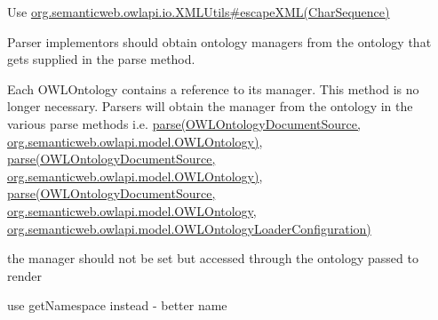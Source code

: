 \begin{DoxyRefList}
\item[\label{deprecated__deprecated000046}%
\hypertarget{deprecated__deprecated000046}{}%
Member \hyperlink{classorg_1_1coode_1_1string_1_1_escape_utils_acffc566dcc652f0075740fc0000e21e6}{org.coode.string.Escape\-Utils.escape\-X\-M\-L} (String s)]Use \hyperlink{classorg_1_1semanticweb_1_1owlapi_1_1io_1_1_x_m_l_utils_a1a205c2f88c8b381b5881f724c330ff2}{org.\-semanticweb.\-owlapi.\-io.\-X\-M\-L\-Utils\#escape\-X\-M\-L(\-Char\-Sequence)}  
\item[\label{deprecated__deprecated000001}%
\hypertarget{deprecated__deprecated000001}{}%
Member \hyperlink{classorg_1_1semanticweb_1_1owlapi_1_1io_1_1_abstract_o_w_l_parser_a0a4fbe6edb85000773d271f0337b7a77}{org.semanticweb.owlapi.io.Abstract\-O\-W\-L\-Parser.get\-O\-W\-L\-Ontology\-Manager} ()]Parser implementors should obtain ontology managers from the ontology that gets supplied in the parse method.  
\item[\label{deprecated__deprecated000002}%
\hypertarget{deprecated__deprecated000002}{}%
Member \hyperlink{interfaceorg_1_1semanticweb_1_1owlapi_1_1io_1_1_o_w_l_parser_a916ddd03b8d8f1b4708f116a66e29469}{org.semanticweb.owlapi.io.O\-W\-L\-Parser.set\-O\-W\-L\-Ontology\-Manager} (O\-W\-L\-Ontology\-Manager owl\-Ontology\-Manager)]Each {\ttfamily O\-W\-L\-Ontology} contains a reference to its manager. This method is no longer necessary. Parsers will obtain the manager from the ontology in the various parse methods i.\-e. \hyperlink{}{parse(\-O\-W\-L\-Ontology\-Document\-Source, org.\-semanticweb.\-owlapi.\-model.\-O\-W\-L\-Ontology)}, \hyperlink{}{parse(\-O\-W\-L\-Ontology\-Document\-Source, org.\-semanticweb.\-owlapi.\-model.\-O\-W\-L\-Ontology)}, \hyperlink{}{parse(\-O\-W\-L\-Ontology\-Document\-Source, org.\-semanticweb.\-owlapi.\-model.\-O\-W\-L\-Ontology, org.\-semanticweb.\-owlapi.\-model.\-O\-W\-L\-Ontology\-Loader\-Configuration)}  
\item[\label{deprecated__deprecated000003}%
\hypertarget{deprecated__deprecated000003}{}%
Member \hyperlink{interfaceorg_1_1semanticweb_1_1owlapi_1_1io_1_1_o_w_l_renderer_ab5374ee2c05ca35bbe5bba335fd5912f}{org.semanticweb.owlapi.io.O\-W\-L\-Renderer.set\-O\-W\-L\-Ontology\-Manager} (O\-W\-L\-Ontology\-Manager owl\-Ontology\-Manager)]the manager should not be set but accessed through the ontology passed to render  
\item[\label{deprecated__deprecated000004}%
\hypertarget{deprecated__deprecated000004}{}%
Member \hyperlink{classorg_1_1semanticweb_1_1owlapi_1_1model_1_1_i_r_i_a163c15f9487f650dc1c4a4940f55a4ca}{org.semanticweb.owlapi.model.I\-R\-I.get\-Start} ()]use get\-Namespace instead -\/ better name  

\end{DoxyRefList}
